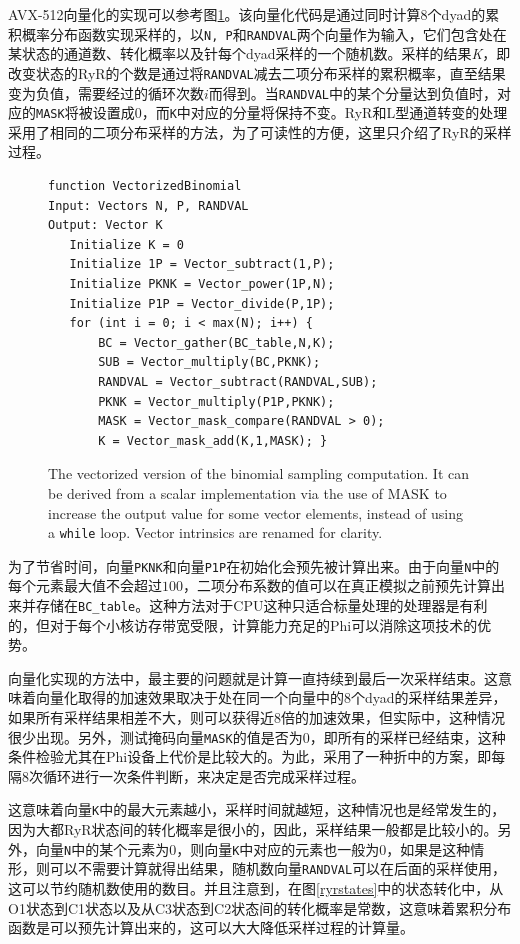 AVX-512向量化的实现可以参考图\ref{Vecbinom}。该向量化代码是通过同时计算8个dyad的累积概率分布函数实现采样的，以{\tt N, P}和{\tt RANDVAL}两个向量作为输入，它们包含处在某状态的通道数、转化概率以及针每个dyad采样的一个随机数。采样的结果{\it K}，即改变状态的RyR的个数是通过将{\tt RANDVAL}减去二项分布采样的累积概率，直至结果变为负值，需要经过的循环次数$i$而得到。当{\tt RANDVAL}中的某个分量达到负值时，对应的{\tt MASK}将被设置成$0$，而{\tt K}中对应的分量将保持不变。RyR和L型通道转变的处理采用了相同的二项分布采样的方法，为了可读性的方便，这里只介绍了RyR的采样过程。

\begin{figure}[hbt]
\small\begin{verbatim}
function VectorizedBinomial
Input: Vectors N, P, RANDVAL
Output: Vector K
   Initialize K = 0
   Initialize 1P = Vector_subtract(1,P);
   Initialize PKNK = Vector_power(1P,N);
   Initialize P1P = Vector_divide(P,1P);
   for (int i = 0; i < max(N); i++) {	
       BC = Vector_gather(BC_table,N,K);
       SUB = Vector_multiply(BC,PKNK);
       RANDVAL = Vector_subtract(RANDVAL,SUB);
       PKNK = Vector_multiply(P1P,PKNK);
       MASK = Vector_mask_compare(RANDVAL > 0);
       K = Vector_mask_add(K,1,MASK); }
\end{verbatim}
\caption{The vectorized version of the binomial sampling computation. It can be derived from a scalar implementation via the use of MASK to increase the output value for some vector elements, instead of using a \texttt{while} loop. Vector intrinsics are renamed for clarity.}
\label{Vecbinom}
\end{figure}

为了节省时间，向量\texttt{PKNK}和向量\texttt{P1P}在初始化会预先被计算出来。由于向量{\tt N}中的每个元素最大值不会超过$100$，二项分布系数的值可以在真正模拟之前预先计算出来并存储在{\tt BC\_table}。这种方法对于CPU这种只适合标量处理的处理器是有利的，但对于每个小核访存带宽受限，计算能力充足的Phi可以消除这项技术的优势。

向量化实现的方法中，最主要的问题就是计算一直持续到最后一次采样结束。这意味着向量化取得的加速效果取决于处在同一个向量中的8个dyad的采样结果差异，如果所有采样结果相差不大，则可以获得近8倍的加速效果，但实际中，这种情况很少出现。另外，测试掩码向量\texttt{MASK}的值是否为0，即所有的采样已经结束，这种条件检验尤其在Phi设备上代价是比较大的。为此，采用了一种折中的方案，即每隔8次循环进行一次条件判断，来决定是否完成采样过程。

这意味着向量{\tt K}中的最大元素越小，采样时间就越短，这种情况也是经常发生的，因为大都RyR状态间的转化概率是很小的，因此，采样结果一般都是比较小的。另外，向量{\tt N}中的某个元素为0，则向量{\tt K}中对应的元素也一般为0，如果是这种情形，则可以不需要计算就得出结果，随机数向量{\tt RANDVAL}可以在后面的采样使用，这可以节约随机数使用的数目。并且注意到，在图\ref{ryrstates}中的状态转化中，从O1状态到C1状态以及从C3状态到C2状态间的转化概率是常数，这意味着累积分布函数是可以预先计算出来的，这可以大大降低采样过程的计算量。

